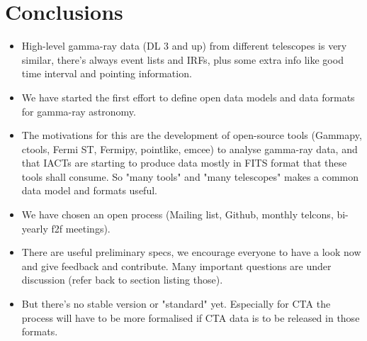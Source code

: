 \section{Conclusions}

\begin{itemize}
    \item High-level gamma-ray data (DL 3 and up) from different telescopes
    is very similar, there's always event lists and IRFs, plus some extra info like
    good time interval and pointing information.
    \item We have started the first effort to define open data models and data formats
    for gamma-ray astronomy.
    \item The motivations for this are the development of open-source tools
    (Gammapy, ctools, Fermi ST, Fermipy, pointlike, emcee) to analyse gamma-ray data,
    and that IACTs are starting to produce data mostly in FITS format that these
    tools shall consume. So "many tools" and "many telescopes" makes a common
    data model and formats useful.
    \item We have chosen an open process (Mailing list, Github, monthly telcons, bi-yearly f2f meetings).
    \item There are useful preliminary specs, we encourage everyone to have a look now
    and give feedback and contribute. Many important questions are under discussion
    (refer back to section listing those).
    \item But there's no stable version or "standard"
    yet. Especially for CTA the process will have to be more formalised if
    CTA data is to be released in those formats.
\end{itemize}
